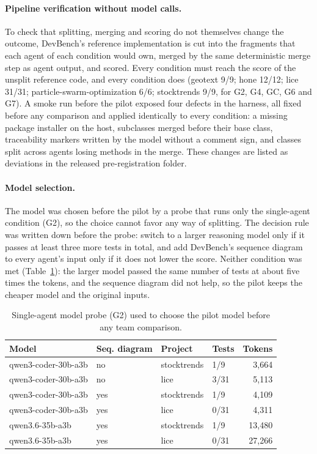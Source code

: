 \paragraph{Pipeline verification without model calls.} To check that splitting, merging and scoring do not themselves change the outcome, DevBench's reference implementation is cut into the fragments that each agent of each condition would own, merged by the same deterministic merge step as agent output, and scored. Every condition must reach the score of the unsplit reference code, and every condition does (geotext 9/9; hone 12/12; lice 31/31; particle-swarm-optimization 6/6; stocktrends 9/9, for G2, G4, GC, G6 and G7). A smoke run before the pilot exposed four defects in the harness, all fixed before any comparison and applied identically to every condition: a missing package installer on the host, subclasses merged before their base class, traceability markers written by the model without a comment sign, and classes split across agents losing methods in the merge. These changes are listed as deviations in the released pre-registration folder.

\paragraph{Model selection.} The model was chosen before the pilot by a probe that runs only the single-agent condition (G2), so the choice cannot favor any way of splitting. The decision rule was written down before the probe: switch to a larger reasoning model only if it passes at least three more tests in total, and add DevBench's sequence diagram to every agent's input only if it does not lower the score. Neither condition was met (Table~\ref{tab:probe}): the larger model passed the same number of tests at about five times the tokens, and the sequence diagram did not help, so the pilot keeps the cheaper model and the original inputs.

\begin{table}[t]\centering\small
\caption{Single-agent model probe (G2) used to choose the pilot model before any team comparison.}\label{tab:probe}
\begin{tabular}{llllr}\toprule
Model & Seq. diagram & Project & Tests & Tokens\\\midrule
qwen3-coder-30b-a3b & no & stocktrends & 1/9 & 3,664\\
qwen3-coder-30b-a3b & no & lice & 3/31 & 5,113\\
qwen3-coder-30b-a3b & yes & stocktrends & 1/9 & 4,109\\
qwen3-coder-30b-a3b & yes & lice & 0/31 & 4,311\\
qwen3.6-35b-a3b & yes & stocktrends & 1/9 & 13,480\\
qwen3.6-35b-a3b & yes & lice & 0/31 & 27,266\\
\bottomrule\end{tabular}\end{table}

